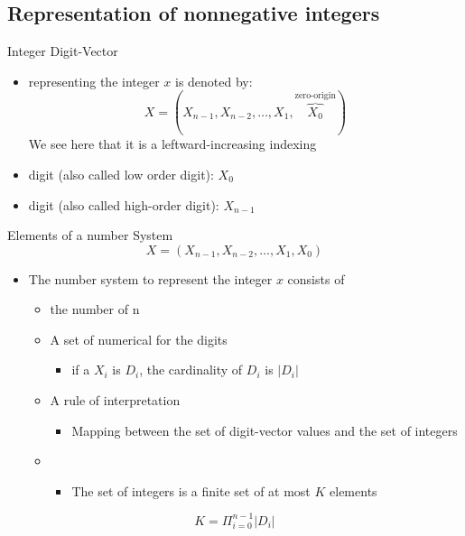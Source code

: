 \subsection{Representation of nonnegative integers}
\begin{parag}{Integer Digit-Vector}
    \begin{itemize}
        \item {} representing the integer $x$ is denoted by:
        \[X = (X_{n-1}, X_{n-2}, \dots, X_1, \overbrace{X_0}^{\text{zero-origin}})\]
        We see here that it is a leftward-increasing indexing
        \item {} digit (also called low order digit): $X_0$
        \item {} digit (also called high-order digit): $X_{n-1}$
    \end{itemize}
\end{parag}
\begin{parag}{Elements of a number System}
    \[X = (X_{n-1}, X_{n-2}, \dots, X_1, X_0)\]
    \begin{itemize}
        \item The number system to represent the integer $x$ consists of
        \begin{itemize}
            \item the number of  n
            \item A set of numerical  for the digits
            \begin{itemize}
                \item if a  $X_i$ is $D_i$, the cardinality of $D_i$ is $|D_i|$
            \end{itemize}
            \item A rule of interpretation
            \begin{itemize}
                \item Mapping between the set of digit-vector values and the set of integers
            \end{itemize}
            \item {}
            \begin{itemize}
                \item The set of integers is a finite set of at most $K$ elements
            \end{itemize}
        \end{itemize}
    \end{itemize}
    \begin{formule}
    \[K = \Pi_{i = 0}^{n-1} |D_i|\]
    \end{formule}
\end{parag}
